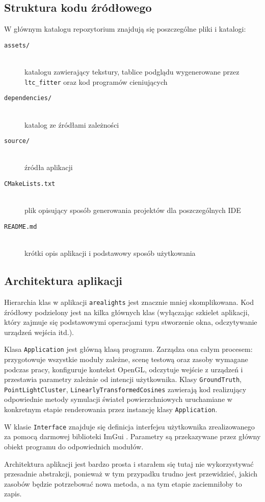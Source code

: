 \documentclass[../main.tex]{subfiles}
\begin{document}
\subsection{Struktura kodu źródłowego}

W głównym katalogu repozytorium znajdują się poszczególne pliki i katalogi:

\begin{description}
    \item[\texttt{assets/}] \hfill \\ 
    katalogu zawierający tekstury, tablice podglądu wygenerowane przez \texttt{ltc\_fitter} oraz kod programów cieniujących
    
    \item[\texttt{dependencies/}] \hfill \\ 
    katalog ze źródłami zależności
    
    \item[\texttt{source/}] \hfill \\ źródła aplikacji
    
    \item[\texttt{CMakeLists.txt}] \hfill\\ 
    plik opisujący sposób generowania projektów dla poszczególnych IDE 

    \item[\texttt{README.md}] \hfill\\ 
    krótki opis aplikacji i podstawowy sposób użytkowania 
    
\end{description}

\subsection{Architektura aplikacji}

Hierarchia klas w aplikacji \texttt{arealights} jest znacznie mniej skomplikowana. Kod źródłowy podzielony jest na kilka głównych klas (wyłączając szkielet aplikacji, który zajmuje się podstawowymi operacjami typu stworzenie okna, odczytywanie urządzeń wejścia itd.).

Klasa \texttt{Application} jest główną klasą programu. Zarządza ona całym procesem: przygotowuje wszystkie moduły zależne, scenę testową oraz zasoby wymagane podczas pracy, konfiguruje kontekst OpenGL, odczytuje wejście z urządzeń i przestawia parametry zależnie od intencji użytkownika. Klasy \texttt{GroundTruth}, \texttt{PointLightCluster}, \texttt{LinearlyTransformedCosines} zawierają kod realizujący odpowiednie metody symulacji świateł powierzchniowych uruchamiane w konkretnym etapie renderowania przez instancję klasy \texttt{Application}.

W klasie \texttt{Interface} znajduje się definicja interfejsu użytkownika zrealizowanego za pomocą darmowej biblioteki ImGui \cite{ImGui}. Parametry są przekazywane przez główny obiekt programu do odpowiednich modułów.

Architektura aplikacji jest bardzo prosta i starałem się tutaj nie wykorzystywać przesadnie abstrakcji, ponieważ w tym przypadku trudno jest przewidzieć, jakich zasobów będzie potrzebować nowa metoda, a na tym etapie zaciemniłoby to zapis.
\end{document}
